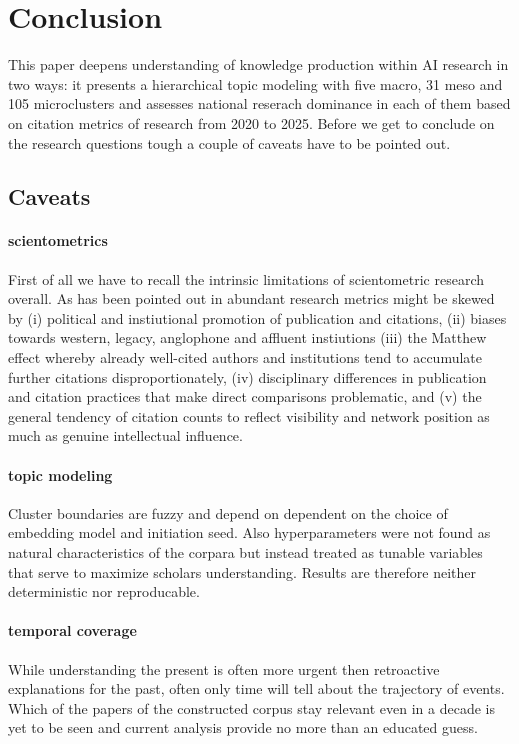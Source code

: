 \documentclass{article}
\begin{document}
\section{Conclusion}

This paper deepens understanding of knowledge production within AI research in two ways: it presents a hierarchical topic modeling with five macro, 31 meso and 105 microclusters and assesses national reserach dominance in each of them based on citation metrics of research from 2020 to 2025. Before we get to conclude on the research questions tough a couple of caveats have to be pointed out.

\subsection{Caveats}

\paragraph{scientometrics} First of all we have to recall the intrinsic limitations of scientometric research overall. As has been pointed out in abundant research metrics might be skewed by (i) political and instiutional promotion of publication and citations, (ii) biases towards western, legacy, anglophone and affluent instiutions (iii) the Matthew effect whereby already well-cited authors and institutions tend to accumulate further citations disproportionately, (iv) disciplinary differences in publication and citation practices that make direct comparisons problematic, and (v) the general tendency of citation counts to reflect visibility and network position as much as genuine intellectual influence.

\paragraph{topic modeling} Cluster boundaries are fuzzy and depend on dependent on the choice of embedding model and initiation seed.    
Also hyperparameters were not found as natural characteristics of the corpara but instead treated as tunable variables that serve to maximize scholars understanding. Results are therefore neither deterministic nor reproducable.

\paragraph{temporal coverage} While understanding the present is often more urgent then retroactive explanations for the past, often only time will tell about the trajectory of events. Which of the papers of the constructed corpus stay relevant even in a decade is yet to be seen and current analysis provide no more than an educated guess.
\end{document}
